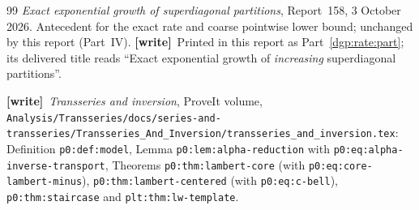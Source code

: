 \documentclass[11pt,letterpaper]{article}
\numberwithin{equation}{section}
\theoremstyle{remark}\newtheorem{remark}[theorem]{Remark}
\newcommand{\file}[1]{\nolinkurl{#1}}
\newcommand{\wtag}{\textup{\textbf{[write]}}}
\begin{document}
\begin{thebibliography}{99}
\emph{Exact exponential growth of superdiagonal partitions},
Report~158, 3 October 2026. Antecedent for the exact rate and coarse
pointwise lower bound; unchanged by this report (Part~IV).
\wtag\ Printed in this report as Part~\ref{dgp:rate:part}; its delivered title reads ``Exact exponential growth of \emph{increasing} superdiagonal partitions''.

 \wtag\ \emph{Transseries and inversion}, ProveIt volume,
\file{Analysis/Transseries/docs/series-and-transseries/Transseries_And_Inversion/transseries_and_inversion.tex}:
Definition \file{p0:def:model}, Lemma \file{p0:lem:alpha-reduction} with \file{p0:eq:alpha-inverse-transport},
Theorems \file{p0:thm:lambert-core} (with \file{p0:eq:core-lambert-minus}),
\file{p0:thm:lambert-centered} (with \file{p0:eq:c-bell}), \file{p0:thm:staircase}
and \file{plt:thm:lw-template}.
\end{thebibliography}
\end{document}
